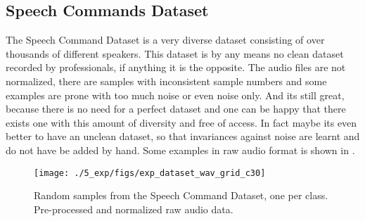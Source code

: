 
\subsection{Speech Commands Dataset}\label{sec:exp_dataset_speech_cmd}
The Speech Command Dataset \cite{warden2018} is a very diverse dataset consisting of over thousands of different speakers. This dataset is by any means no clean dataset recorded by professionals, if anything it is the opposite. 
The audio files are not normalized, there are samples with inconsistent sample numbers and some examples are prone with too much noise or even noise only.
And its still great, because there is no need for a perfect dataset and one can be happy that there exists one with this amount of diversity and free of access.
In fact maybe its even better to have an unclean dataset, so that invariances against noise are learnt and do not have be added by hand.
Some examples in raw audio format is shown in .
\begin{figure}[!ht]
  \centering
    \texttt{[image: ./5\_exp/figs/exp\_dataset\_wav\_grid\_c30]}
  \caption{Random samples from the Speech Command Dataset, one per class. Pre-processed and normalized raw audio data.}
  \label{fig:exp_dataset_wav_grid_c30}
\end{figure}
\FloatBarrier
\noindent